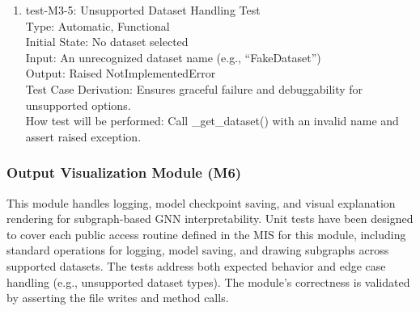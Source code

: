 \documentclass[12pt, titlepage]{article}
\begin{document}
\begin{enumerate}
\item{test-M3-5: Unsupported Dataset Handling Test\\}
Type: Automatic, Functional \\
Initial State: No dataset selected \\
Input: An unrecognized dataset name (e.g., ``FakeDataset'') \\
Output: Raised NotImplementedError \\
Test Case Derivation: Ensures graceful failure and debuggability for unsupported options. \\
How test will be performed: Call \_get\_dataset() with an invalid name and assert raised exception.

\end{enumerate}


\subsubsection{Output Visualization Module (M6)}

This module handles logging, model checkpoint saving, and visual explanation rendering for subgraph-based GNN interpretability. Unit tests have been designed to cover each public access routine defined in the MIS for this module, including standard operations for logging, model saving, and drawing subgraphs across supported datasets. The tests address both expected behavior and edge case handling (e.g., unsupported dataset types). The module’s correctness is validated by asserting the file writes and method calls.
\end{document}
